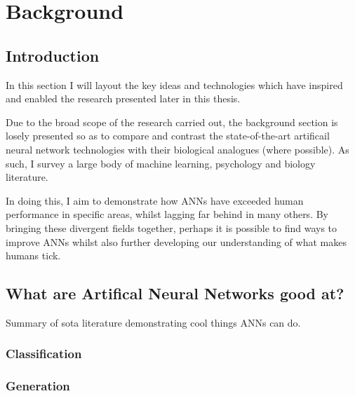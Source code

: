 
\chapter{Background} %

\label{Chapter2} %



\section{Introduction}\label{Lit:Intro}
In this section I will layout the key ideas and technologies which have inspired and enabled the research presented later in this thesis.

Due to the broad scope of the research carried out, the background section is losely presented so as to compare and contrast the state-of-the-art artificail neural network technologies with their biological analogues (where possible). As such, I survey a large body of machine learning, psychology and biology literature.

In doing this, I aim to demonstrate how ANNs have exceeded human performance in specific areas, whilst lagging far behind in many others. By bringing these divergent fields together, perhaps it is possible to find ways to improve ANNs whilst also further developing our understanding of what makes humans tick. 


\section{What are Artifical Neural Networks good at?}
Summary of sota literature demonstrating cool things ANNs can do.
\subsection{Classification}
\subsection{Generation}
